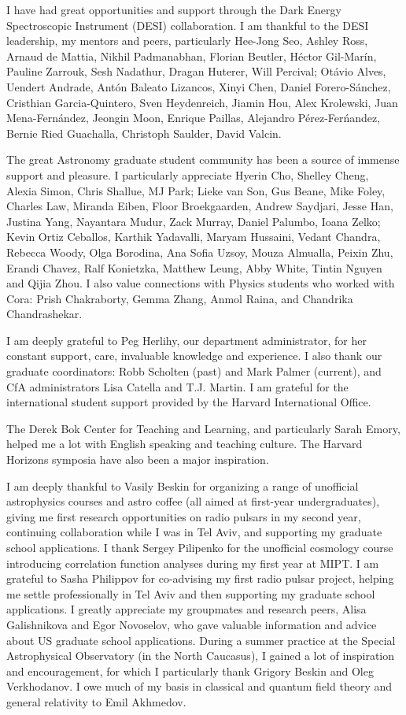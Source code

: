 I have had great opportunities and support through the Dark Energy Spectroscopic Instrument (DESI) collaboration.
I am thankful to the DESI leadership, my mentors and peers, particularly Hee-Jong Seo, Ashley Ross, Arnaud de Mattia, Nikhil Padmanabhan, Florian Beutler, H\'ector Gil-Mar\'in, Pauline Zarrouk, Sesh Nadathur, Dragan Huterer, Will Percival;
Ot\'avio Alves, Uendert Andrade, Ant\'on Baleato Lizancos, Xinyi Chen, Daniel Forero-S\'anchez, Cristhian Garcia-Quintero, Sven Heydenreich, Jiamin Hou, Alex Krolewski, Juan Mena-Fern\'andez, Jeongin Moon, Enrique Paillas, Alejandro P\'erez-Fer\'nandez, Bernie Ried Guachalla, Christoph Saulder, David Valcin.

The great Astronomy graduate student community has been a source of immense support and pleasure.
I particularly appreciate
Hyerin Cho, Shelley Cheng, Alexia Simon, Chris Shallue, MJ Park;
Lieke van Son, Gus Beane, Mike Foley, Charles Law, Miranda Eiben, Floor Broekgaarden, Andrew Saydjari, Jesse Han, Justina Yang, Nayantara Mudur, Zack Murray, Daniel Palumbo, Ioana Zelko;
Kevin Ortiz Ceballos, Karthik Yadavalli, Maryam Hussaini, Vedant Chandra, Rebecca Woody,
Olga Borodina, Ana Sofia Uzsoy, Mouza Almualla, Peixin Zhu, Erandi Chavez,
Ralf Konietzka, Matthew Leung, Abby White,
Tintin Nguyen and Qijia Zhou.
I also value connections with Physics students who worked with Cora: Prish Chakraborty, Gemma Zhang, Anmol Raina, and Chandrika Chandrashekar.

I am deeply grateful to Peg Herlihy, our department administrator, for her constant support, care, invaluable knowledge and experience.
I also thank our graduate coordinators: Robb Scholten (past) and Mark Palmer (current), and CfA administrators Lisa Catella and T.J. Martin.
I am grateful for the international student support provided by the Harvard International Office.

The Derek Bok Center for Teaching and Learning, and particularly Sarah Emory, helped me a lot with English speaking and teaching culture.
The Harvard Horizons symposia have also been a major inspiration.

I am deeply thankful to Vasily Beskin for organizing a range of unofficial astrophysics courses and astro coffee (all aimed at first-year undergraduates), giving me first research opportunities on radio pulsars in my second year, continuing collaboration while I was in Tel Aviv, and supporting my graduate school applications.
I thank Sergey Pilipenko for the unofficial cosmology course introducing correlation function analyses during my first year at MIPT.
I am grateful to Sasha Philippov for co-advising my first radio pulsar project, helping me settle professionally in Tel Aviv and then supporting my graduate school applications.
I greatly appreciate my groupmates and research peers, Alisa Galishnikova and Egor Novoselov, who gave valuable information and advice about US graduate school applications.
During a summer practice at the Special Astrophysical Observatory (in the North Caucasus), I gained a lot of inspiration and encouragement, for which I particularly thank Grigory Beskin and Oleg Verkhodanov.
I owe much of my basis in classical and quantum field theory and general relativity to Emil Akhmedov.

